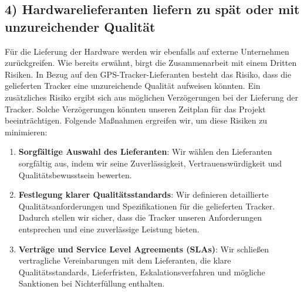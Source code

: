 \subsection*{4) Hardwarelieferanten liefern zu spät oder mit unzureichender Qualität}
Für die Lieferung der Hardware werden wir ebenfalls auf externe Unternehmen zurückgreifen.
Wie bereits erwähnt, birgt die Zusammenarbeit mit einem Dritten Risiken.
In Bezug auf den GPS-Tracker-Lieferanten besteht das Risiko, dass die gelieferten Tracker eine unzureichende Qualität aufweisen könnten.
Ein zusätzliches Risiko ergibt sich aus möglichen Verzögerungen bei der Lieferung der Tracker.
Solche Verzögerungen könnten unseren Zeitplan für das Projekt beeinträchtigen.
Folgende Maßnahmen ergreifen wir, um diese Risiken zu minimieren:
\begin{enumerate}
    \item \textbf{Sorgfältige Auswahl des Lieferanten}: Wir wählen den Lieferanten sorgfältig aus, indem wir seine Zuverlässigkeit, Vertrauenswürdigkeit und Qualitätsbewusstsein bewerten.
    \item \textbf{Festlegung klarer Qualitätsstandards}: Wir definieren detaillierte Qualitätsanforderungen und Spezifikationen für die gelieferten Tracker. Dadurch stellen wir sicher, dass die Tracker unseren Anforderungen entsprechen und eine zuverlässige Leistung bieten.
    \item \textbf{Verträge und Service Level Agreements (SLAs)}: Wir schließen vertragliche Vereinbarungen mit dem Lieferanten, die klare Qualitätsstandards, Lieferfristen, Eskalationsverfahren und mögliche Sanktionen bei Nichterfüllung enthalten.
\end{enumerate}

